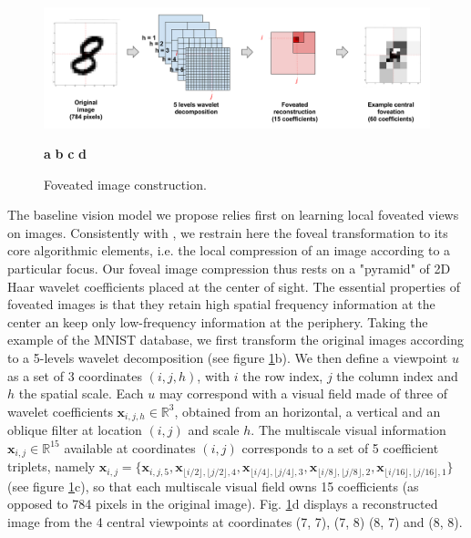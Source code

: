 \documentclass{article} %
\begin{document}
\begin{figure}[b!]
	\centerline{
		\includegraphics[width = \linewidth]{img/ICLR-foveated-model.png} 
	}
	\centerline{
		\hspace{2cm}
		\textbf{a}
		\hspace{4cm}
		\textbf{b}	
		\hspace{3cm}
		\textbf{c}
		\hspace{3cm}
		\textbf{d}
		\hspace{2cm}			
	}
	\caption{Foveated image construction.}\label{fig:foveated}
\end{figure}

The baseline vision model we propose relies first on learning local foveated views on images. %
Consistently with \cite{kortum1996implementation,wang2003foveation}, we restrain here the foveal transformation to its core algorithmic elements, i.e. the local compression of an image according to a particular focus. Our foveal image compression thus rests on a "pyramid" of 2D Haar wavelet coefficients placed at the center of sight. The essential properties of foveated images is that they retain high spatial frequency information at the center an keep only low-frequency information at the periphery.  Taking the example of the MNIST database, we first transform the original images according to a 5-levels wavelet decomposition (see figure \ref{fig:foveated}b). We then define a viewpoint $u$ as a set of 3 coordinates $(i,j,h)$, with $i$ the row index, $j$ the column index and $h$ the spatial scale. Each $u$ may correspond with a visual field made of three of wavelet coefficients $\boldsymbol{x}_{i,j,h} \in \mathbb{R}^3$, obtained from an horizontal, a vertical and an oblique filter at location $(i,j)$ and scale $h$.  The multiscale visual information $\boldsymbol{x}_{i,j} \in \mathbb{R}^{15}$ available at coordinates $(i,j)$ corresponds to a set of 5 coefficient triplets, namely $\boldsymbol{x}_{i,j}=\{\boldsymbol{x}_{i,j,5}, \boldsymbol{x}_{\lfloor i/2\rfloor,\lfloor j/2\rfloor,4}, \boldsymbol{x}_{\lfloor i/4\rfloor,\lfloor j/4\rfloor,3}, \boldsymbol{x}_{\lfloor i/8\rfloor,\lfloor j/8\rfloor, 2}, \boldsymbol{x}_{\lfloor i/16\rfloor,\lfloor j/16\rfloor, 1}\}$ (see figure \ref{fig:foveated}c), so that each multiscale visual field owns 15 coefficients (as opposed to 784 pixels in the original image).
Fig. \ref{fig:foveated}d displays a reconstructed image from the 4 central viewpoints at coordinates (7, 7), (7, 8) (8, 7) and (8, 8).
\end{document}
